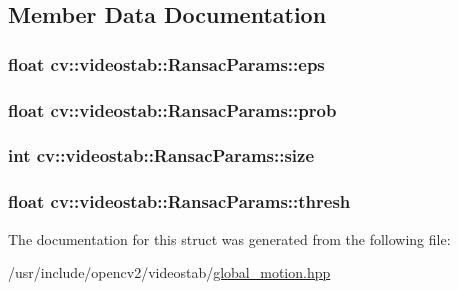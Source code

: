 \subsection{Member Data Documentation}
\hypertarget{structcv_1_1videostab_1_1RansacParams_a12a0a87af93c54e5b9dd67aea517d2dd}{
\subsubsection[{eps}]{\setlength{\rightskip}{0pt plus 5cm}float cv\-::videostab\-::\-Ransac\-Params\-::eps}}\label{structcv_1_1videostab_1_1RansacParams_a12a0a87af93c54e5b9dd67aea517d2dd}
\hypertarget{structcv_1_1videostab_1_1RansacParams_aa43b08b4dfbc551b19f1217f8c67f5ca}{
\subsubsection[{prob}]{\setlength{\rightskip}{0pt plus 5cm}float cv\-::videostab\-::\-Ransac\-Params\-::prob}}\label{structcv_1_1videostab_1_1RansacParams_aa43b08b4dfbc551b19f1217f8c67f5ca}
\hypertarget{structcv_1_1videostab_1_1RansacParams_a1c3369153b15c7f673d2afd5b07a55c1}{
\subsubsection[{size}]{\setlength{\rightskip}{0pt plus 5cm}int cv\-::videostab\-::\-Ransac\-Params\-::size}}\label{structcv_1_1videostab_1_1RansacParams_a1c3369153b15c7f673d2afd5b07a55c1}
\hypertarget{structcv_1_1videostab_1_1RansacParams_a2558a62a1e6b2ad8f47222f175348a6b}{
\subsubsection[{thresh}]{\setlength{\rightskip}{0pt plus 5cm}float cv\-::videostab\-::\-Ransac\-Params\-::thresh}}\label{structcv_1_1videostab_1_1RansacParams_a2558a62a1e6b2ad8f47222f175348a6b}


The documentation for this struct was generated from the following file\-:\begin{DoxyCompactItemize}
\item 
/usr/include/opencv2/videostab/\hyperlink{global__motion_8hpp}{global\-\_\-motion.\-hpp}\end{DoxyCompactItemize}
